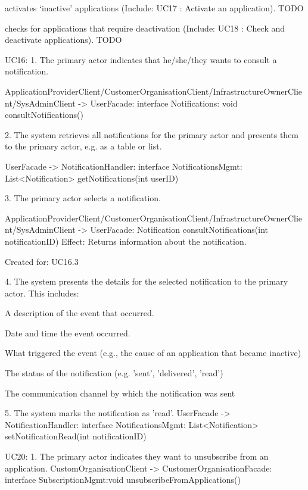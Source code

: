 {{{{{{{           { activates ‘inactive’ applications (Include: UC17 : Activate an application).
            TODO

           { checks for applications that require deactivation (Include: UC18 : Check and deactivate applications).
            TODO


    UC16:
        1. The primary actor indicates that he/she/they wants to consult a notification.

            ApplicationProviderClient/CustomerOrganisationClient/InfrastructureOwnerClient/SysAdminClient -> UserFacade: interface Notifications: void consultNotifications()

        2. The system retrieves all notifications for the primary actor and presents them to the primary actor, e.g. as a table or list.

            UserFacade -> NotificationHandler: interface NotificationsMgmt: List<Notification> getNotifications(int userID)

        3. The primary actor selects a notification.

            ApplicationProviderClient/CustomerOrganisationClient/InfrastructureOwnerClient/SysAdminClient -> UserFacade: Notification consultNotifications(int notificationID)
                Effect: Returns information about the notification.
                \item Created for: UC16.3

        4. The system presents the details for the selected notification to the primary actor. This includes:
            { A description of the event that occurred.

            { Date and time the event occurred.

            { What triggered the event (e.g., the cause of an application that became inactive)

            { The status of the notification (e.g. 'sent', 'delivered', 'read')

            { The communication channel by which the notification was sent


        5. The system marks the notification as 'read'.
            UserFacade -> NotificationHandler: interface NotificationsMgmt: List<Notification> setNotificationRead(int notificationID)

    UC20:
        1. The primary actor indicates they want to unsubscribe from an application.
            CustomOrganisationClient -> CustomerOrganisationFacade: interface SubscriptionMgmt:void  unsubscribeFromApplications()


}}}}}}}}}}}}}}
